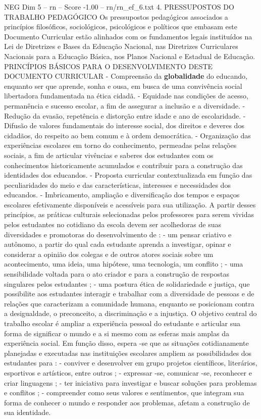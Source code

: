 \begin{textsample}{NEG Dim 5 – rn – Score -1.00 – rn/rn\_ef\_6.txt}  \label{ex:f5_neg_141}
4.
PRESSUPOSTOS DO TRABALHO PEDAGÓGICO Os pressupostos pedagógicos associados a princípios filosóficos, sociológicos, psicológicos e políticos que embasam este Documento Curricular estão alinhados com os fundamentos legais instituídos na Lei de Diretrizes e Bases da Educação Nacional, nas Diretrizes Curriculares Nacionais para a Educação Básica, nos Planos Nacional e Estadual de Educação.
PRINCÍPIOS BÁSICOS PARA O DESENVOLVIMENTO DESTE DOCUMENTO CURRICULAR - Compreensão da \textbf{globalidade} do educando, enquanto ser que aprende, sonha e ousa, em busca de uma convivência social libertadora fundamentada na ética cidadã. - Equidade nas condições de acesso, permanência e sucesso escolar, a fim de assegurar a inclusão e a diversidade. - Redução da evasão, repetência e distorção entre idade e ano de escolaridade. - Difusão de valores fundamentais do interesse social, dos direitos e deveres dos cidadãos, do respeito ao bem comum e à ordem democrática. - Organização das experiências escolares em torno do conhecimento, permeadas pelas relações sociais, a fim de articular vivências e saberes dos estudantes com os conhecimentos historicamente acumulados e contribuir para a construção das identidades dos educandos. - Proposta curricular contextualizada em função das peculiaridades do meio e das características, interesses e necessidades dos educandos. - Imbricamento, ampliação e diversificação dos tempos e espaços escolares efetivamente disponíveis e acessíveis para sua utilização.
A partir desses princípios, as práticas culturais selecionadas pelos professores para serem vividas pelos estudantes no cotidiano da escola devem ser acolhedoras de suas diversidades e promotoras do desenvolvimento de : - um pensar criativo e autônomo, a partir do qual cada estudante aprenda a investigar, opinar e considerar a opinião dos colegas e de outros atores sociais sobre um acontecimento, uma ideia, uma hipótese, uma tecnologia, um conflito ; - uma sensibilidade voltada para o ato criador e para a construção de respostas singulares pelos estudantes ; - uma postura ética de solidariedade e justiça, que possibilite aos estudantes interagir e trabalhar com a diversidade de pessoas e de relações que caracterizam a comunidade humana, enquanto se posicionam contra a desigualdade, o preconceito, a discriminação e a injustiça.
O objetivo central do trabalho escolar é ampliar a experiência pessoal do estudante e articular sua forma de significar o mundo e a si mesmo com as esferas mais amplas da experiência social.
Em função disso, espera -se que as situações cotidianamente planejadas e executadas nas instituições escolares ampliem as possibilidades dos estudantes para : - conviver e desenvolver em grupo projetos científicos, literários, esportivos e artísticos, entre outros ; - expressar -se, comunicar -se, reconhecer e criar linguagens ; - ter iniciativa para investigar e buscar soluções para problemas e conflitos ; - compreender como seus valores e sentimentos, que integram sua forma de conhecer o mundo e responder aos problemas, afetam a construção de sua identidade.

\end{textsample}
